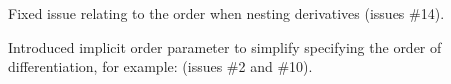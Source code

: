 \begin{changelog}
\begin{change}[version=1.3, date=2023-07-26, beta=false]
	\end{change}
	\begin{change}[version=1.31, date=2023-11-04, beta=false]
		\item Fixed issue relating to the order when nesting derivatives (issues \#14).
	\end{change}
	\bigskip
	\begin{change}[version=1.4, date=2024-02-08, beta=false]
		\item Introduced implicit order parameter to simplify specifying the order of differentiation, for example:  (issues \#2 and \#10).
	\end{change}
\end{changelog}

	
